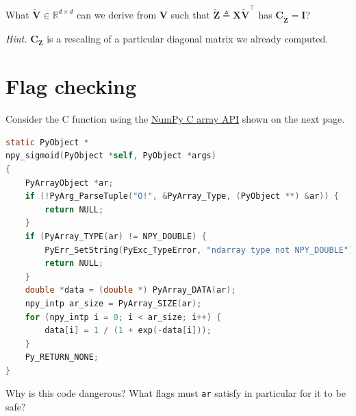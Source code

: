 \documentclass{article}
\numberwithin{equation}{section}
\begin{document}
\medskip

What $ \tilde{\mathbf{V}} \in \mathbb{R}^{d \times d} $ can we derive from
$ \mathbf{V} $ such that $ \tilde{\mathbf{Z}} \triangleq
\mathbf{X}\tilde{\mathbf{V}}^\top $ has
$ \mathbf{C}_{\tilde{\mathbf{Z}}} = \mathbf{I} $?

\medskip

\textit{Hint.} $ \mathbf{C}_\mathbf{Z} $ is a rescaling of a particular
diagonal matrix we already computed.

\section{Flag checking}

Consider the C function using the \href{
    https://numpy.org/devdocs/reference/c-api/array.html
}{NumPy C array API} shown on the next page.

\begin{lstlisting}[language = C]
static PyObject *
npy_sigmoid(PyObject *self, PyObject *args)
{
    PyArrayObject *ar;
    if (!PyArg_ParseTuple("O!", &PyArray_Type, (PyObject **) &ar)) {
        return NULL;
    }
    if (PyArray_TYPE(ar) != NPY_DOUBLE) {
        PyErr_SetString(PyExc_TypeError, "ndarray type not NPY_DOUBLE");
        return NULL;
    }
    double *data = (double *) PyArray_DATA(ar);
    npy_intp ar_size = PyArray_SIZE(ar);
    for (npy_intp i = 0; i < ar_size; i++) {
        data[i] = 1 / (1 + exp(-data[i]));
    }
    Py_RETURN_NONE;
}
\end{lstlisting}

Why is this code dangerous? What flags must \texttt{ar} satisfy in particular
for it to be safe?
\end{document}
